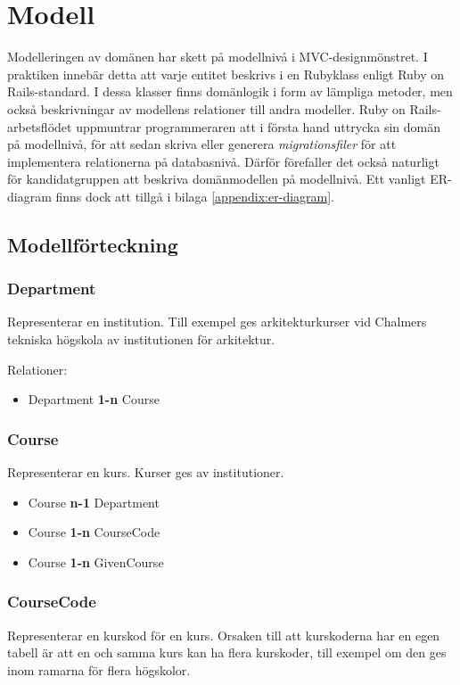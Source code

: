\section{Modell}

Modelleringen av domänen har skett på modellnivå i MVC-designmönstret. 
I praktiken innebär detta att varje entitet beskrivs i en Rubyklass enligt Ruby on Rails-standard.
I dessa klasser finns domänlogik i form av lämpliga metoder, men också beskrivningar av 
modellens relationer till andra modeller.
Ruby on Rails-arbetsflödet uppmuntrar programmeraren att i första hand uttrycka sin domän på modellnivå,
för att sedan skriva eller generera \emph{migrationsfiler} för att implementera relationerna på databasnivå.
Därför förefaller det också naturligt för kandidatgruppen att beskriva domänmodellen på modellnivå.
Ett vanligt ER-diagram finns dock att tillgå i bilaga \ref{appendix:er-diagram}.

\subsection{Modellförteckning}
\subsubsection{Department}
Representerar en institution. Till exempel ges arkitekturkurser vid Chalmers tekniska högskola av institutionen för arkitektur.

Relationer:
\begin{itemize}
	\item Department {\bf 1-n} Course
\end{itemize}


\subsubsection{Course}
Representerar en kurs. Kurser ges av institutioner.

\begin{itemize}
	\item Course {\bf n-1} Department
	\item Course {\bf 1-n} CourseCode
	\item Course {\bf 1-n} GivenCourse
\end{itemize}


\subsubsection{CourseCode}
Representerar en kurskod för en kurs. Orsaken till att kurskoderna har en egen tabell är att en och samma kurs kan ha flera kurskoder, till exempel om den ges inom ramarna för flera högskolor.

